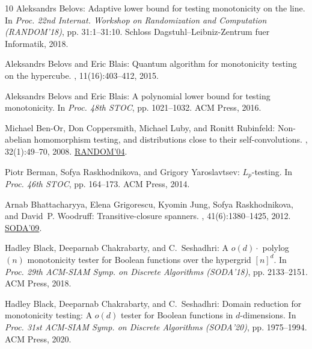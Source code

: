 \documentclass[11pt]{article}
\numberwithin{equation}{section}
\theoremstyle{definition}
\theoremstyle{plain}
\begin{document}
\begin{thebibliography}{10}
{\sc Aleksandrs Belovs}: Adaptive lower bound for testing monotonicity on the
  line.
\newblock In {\em Proc. 22nd Internat. Workshop on Randomization and
  Computation (RANDOM'18)}, pp. 31:1--31:10. Schloss Dagstuhl--Leibniz-Zentrum
  fuer Informatik, 2018.

{\sc Aleksandrs Belovs and Eric Blais}: Quantum algorithm for monotonicity
  testing on the hypercube.
, 11(16):403--412, 2015.

{\sc Aleksandrs Belovs and Eric Blais}: A polynomial lower bound for testing
  monotonicity.
\newblock In {\em Proc. 48th STOC}, pp. 1021--1032. ACM Press, 2016.

{\sc Michael Ben{-}Or, Don Coppersmith, Michael Luby, and Ronitt Rubinfeld}:
  Non-abelian homomorphism testing, and distributions close to their
  self-convolutions.
, 32(1):49--70, 2008.
\newblock \prelim
  \href{https://doi.org/10.1007/978-3-540-27821-4\_25}{RANDOM'04}.

{\sc Piotr Berman, Sofya Raskhodnikova, and Grigory Yaroslavtsev}:
  {$L_p$-testing}.
\newblock In {\em Proc. 46th STOC}, pp. 164--173. ACM Press, 2014.
\newblock [\epfmtdoi{10.1145/2591796.2591887}]

{\sc Arnab Bhattacharyya, Elena Grigorescu, Kyomin Jung, Sofya Raskhodnikova,
  and David~P. Woodruff}: Transitive-closure spanners.
, 41(6):1380--1425, 2012.
\newblock \prelim \href{https://doi.org/10.1137/1.9781611973068.101}{SODA'09}.

{\sc Hadley Black, Deeparnab Chakrabarty, and C.~Seshadhri}: A $o(d)\cdot$
  polylog$(n)$ monotonicity tester for {Boolean} functions over the hypergrid
  $[n]^d$.
\newblock In {\em Proc. 29th ACM-SIAM Symp. on Discrete Algorithms (SODA'18)},
  pp. 2133--2151. ACM Press, 2018.

{\sc Hadley Black, Deeparnab Chakrabarty, and C.~Seshadhri}: Domain reduction
  for monotonicity testing: {A} $o(d)$ tester for {Boolean} functions in
  $d$-dimensions.
\newblock In {\em Proc. 31st ACM-SIAM Symp. on Discrete Algorithms (SODA'20)},
  pp. 1975--1994. ACM Press, 2020.


\end{thebibliography}
\end{document}
